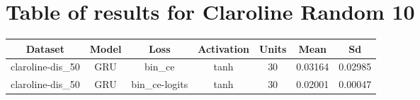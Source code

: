 \documentclass{article}%
\begin{document}
%
\newpage%
\section{Table of results for Claroline Random 10}%
\label{sec:TableofresultsforClarolineRandom10}%
\begin{longtable}{|c|c|c|c|c|c|c|}%
\hline%
\rowcolor{lightgray!70}%
\textbf{Dataset}&\textbf{Model}&\textbf{Loss}&\textbf{Activation}&\textbf{Units}&\textbf{Mean}&\textbf{Sd}\\%
\hline%
claroline{-}dis\_50&GRU&bin\_ce&tanh&30&0.03164&0.02985\\%
\hline%
claroline{-}dis\_50&GRU&bin\_ce{-}logits&tanh&30&0.02001&0.00047\\%
\hline%
\end{longtable}

%
\newpage%
\end{document}
